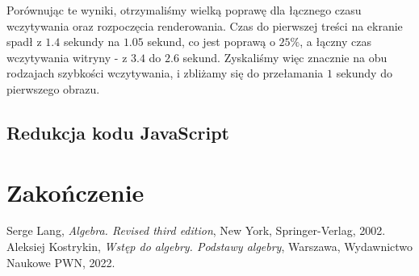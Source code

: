 \documentclass[licencjacka]{pracadypl}
\begin{document}
Porównując te wyniki, otrzymaliśmy wielką poprawę dla łącznego czasu wczytywania oraz rozpoczęcia renderowania. Czas do pierwszej treści na ekranie spadł z $1.4$ sekundy na $1.05$ sekund, co jest poprawą o $25\%$, a łączny czas wczytywania witryny - z $3.4$ do $2.6$ sekund. Zyskaliśmy więc znacznie na obu rodzajach szybkości wczytywania, i zbliżamy się do przełamania $1$ sekundy do pierwszego obrazu.

\section{Redukcja kodu JavaScript}



\chapter{Zakończenie}

\begin{thebibliography}{7}
%
Serge Lang, 
\textit{Algebra. Revised third edition}, 
New York, Springer-Verlag, 2002.
%
Aleksiej Kostrykin, 
\textit{Wstęp do algebry. Podstawy algebry},
Warszawa, Wydawnictwo Naukowe PWN, 2022.
\end{thebibliography}
\end{document}
